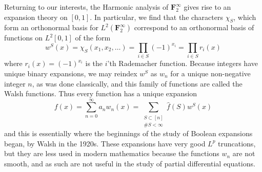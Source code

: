 Returning to our interests, the Harmonic analysis of $\mathbf{F}_2^\infty$ gives rise to an expansion theory on $[0,1]$. In particular, we find that the characters $\chi_S$, which form an orthonormal basis for $L^2(\mathbf{F}_2^\infty)$ correspond to an orthonormal basis of functions on $L^2[0,1]$ of the form
%
\[ w^S(x) = \chi_S(x_1, x_2, \dots) = \prod_{i \in S} (-1)^{x_i} = \prod_{i \in S} r_i(x) \]
%
where $r_i(x) = (-1)^{x_i}$ is the $i$'th Rademacher function. Because integers have unique binary expansions, we may reindex $w^S$ as $w_n$ for a unique non-negative integer $n$, as was done classically, and this family of functions are called the Walsh functions. Thus every function has a unique expansion
%
\[ f(x) = \sum_{n = 0}^\infty a_n w_n(x) = \sum_{\substack{S \subset [n]\\ \# S < \infty}} \widehat{f}(S) w^S(x) \]
%
and this is essentially where the beginnings of the study of Boolean expansions began, by Walsh in the 1920s. These expansions have very good $L^p$ truncations, but they are less used in modern mathematics because the functions $w_n$ are not smooth, and as such are not useful in the study of partial differential equations.


